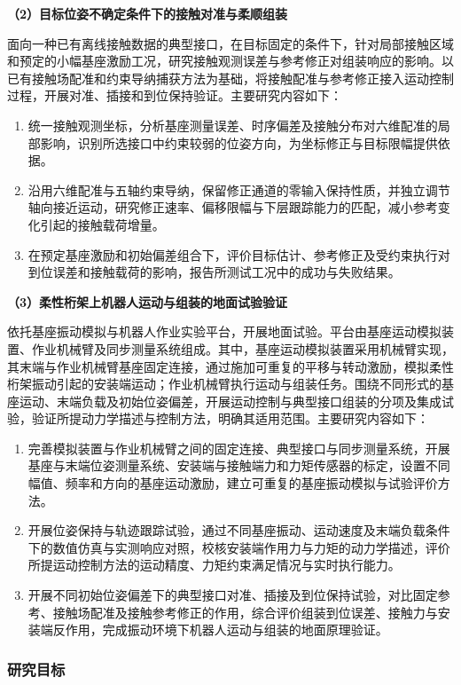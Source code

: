 \documentclass[UTF8,a4paper,zihao=-4,fontset=fandol]{ctexart}
\newcommand{\topic}[1]{\par\addvspace{0.5em}\noindent\textbf{#1}\par\nobreak}
\begin{document}
\topic{（2）目标位姿不确定条件下的接触对准与柔顺组装}

面向一种已有离线接触数据的典型接口，在目标固定的条件下，针对局部接触区域和预定的小幅基座激励工况，研究接触观测误差与参考修正对组装响应的影响。以已有接触场配准和约束导纳捕获方法为基础，将接触配准与参考修正接入运动控制过程，开展对准、插接和到位保持验证。主要研究内容如下：
\begin{enumerate}[label=\arabic*)]
 \item 统一接触观测坐标，分析基座测量误差、时序偏差及接触分布对六维配准的局部影响，识别所选接口中约束较弱的位姿方向，为坐标修正与目标限幅提供依据。
 \item 沿用六维配准与五轴约束导纳，保留修正通道的零输入保持性质，并独立调节轴向接近运动，研究修正速率、偏移限幅与下层跟踪能力的匹配，减小参考变化引起的接触载荷增量。
 \item 在预定基座激励和初始偏差组合下，评价目标估计、参考修正及受约束执行对到位误差和接触载荷的影响，报告所测试工况中的成功与失败结果。
\end{enumerate}

\topic{（3）柔性桁架上机器人运动与组装的地面试验验证}

依托基座振动模拟与机器人作业实验平台，开展地面试验。平台由基座运动模拟装置、作业机械臂及同步测量系统组成。其中，基座运动模拟装置采用机械臂实现，其末端与作业机械臂基座固定连接，通过施加可重复的平移与转动激励，模拟柔性桁架振动引起的安装端运动；作业机械臂执行运动与组装任务。围绕不同形式的基座运动、末端负载及初始位姿偏差，开展运动控制与典型接口组装的分项及集成试验，验证所提动力学描述与控制方法，明确其适用范围。主要研究内容如下：
\begin{enumerate}[label=\arabic*)]
 \item 完善模拟装置与作业机械臂之间的固定连接、典型接口与同步测量系统，开展基座与末端位姿测量系统、安装端与接触端力和力矩传感器的标定，设置不同幅值、频率和方向的基座运动激励，建立可重复的基座振动模拟与试验评价方法。
 \item 开展位姿保持与轨迹跟踪试验，通过不同基座振动、运动速度及末端负载条件下的数值仿真与实测响应对照，校核安装端作用力与力矩的动力学描述，评价所提运动控制方法的运动精度、力矩约束满足情况与实时执行能力。
 \item 开展不同初始位姿偏差下的典型接口对准、插接及到位保持试验，对比固定参考、接触场配准及接触参考修正的作用，综合评价组装到位误差、接触力与安装端反作用，完成振动环境下机器人运动与组装的地面原理验证。
\end{enumerate}

\subsubsection{研究目标}
\end{document}
